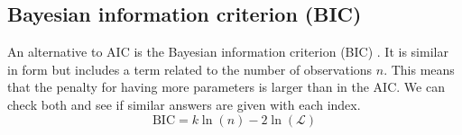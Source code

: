 %
%

\subsection{Bayesian information criterion (BIC)}
An alternative to AIC is the Bayesian information criterion (BIC) \cite{Schwarz:1978}.  It is similar in form but includes a term related to the number of observations $n$.  This means that the penalty for having more parameters is larger than in the AIC.  We can check both and see if similar answers are given with each index.
\begin{equation}
\mbox{BIC} = k \ln(n) - 2 \ln(\mathcal{L}) 
\end{equation}



